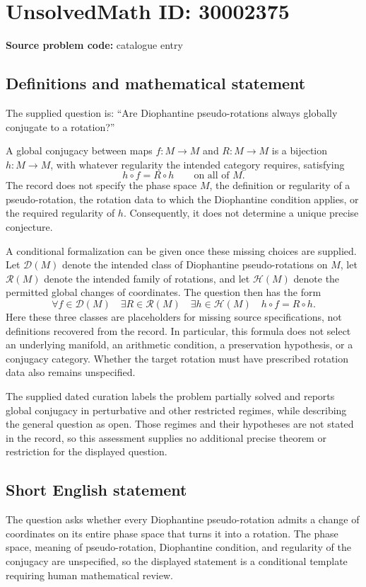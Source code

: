\documentclass[11pt]{article}
\begin{document}
\section*{UnsolvedMath ID: 30002375}
\textbf{Source problem code:} catalogue entry
\subsection{Definitions and mathematical statement}
The supplied question is: ``Are Diophantine pseudo-rotations always globally conjugate to a rotation?''

A global conjugacy between maps \(f\colon M\to M\) and \(R\colon M\to M\) is a bijection \(h\colon M\to M\), with whatever regularity the intended category requires, satisfying
\[
 h\circ f=R\circ h
 \qquad\text{on all of }M.
\]
The record does not specify the phase space \(M\), the definition or regularity of a pseudo-rotation, the rotation data to which the Diophantine condition applies, or the required regularity of \(h\). Consequently, it does not determine a unique precise conjecture.

A conditional formalization can be given once these missing choices are supplied. Let \(\mathcal D(M)\) denote the intended class of Diophantine pseudo-rotations on \(M\), let \(\mathcal R(M)\) denote the intended family of rotations, and let \(\mathcal H(M)\) denote the permitted global changes of coordinates. The question then has the form
\[
 \forall f\in\mathcal D(M)\quad
 \exists R\in\mathcal R(M)\quad
 \exists h\in\mathcal H(M)\quad
 h\circ f=R\circ h.
\]
Here these three classes are placeholders for missing source specifications, not definitions recovered from the record. In particular, this formula does not select an underlying manifold, an arithmetic condition, a preservation hypothesis, or a conjugacy category. Whether the target rotation must have prescribed rotation data also remains unspecified.

The supplied dated curation labels the problem partially solved and reports global conjugacy in perturbative and other restricted regimes, while describing the general question as open. Those regimes and their hypotheses are not stated in the record, so this assessment supplies no additional precise theorem or restriction for the displayed question.
\subsection{Short English statement}
The question asks whether every Diophantine pseudo-rotation admits a change of coordinates on its entire phase space that turns it into a rotation. The phase space, meaning of pseudo-rotation, Diophantine condition, and regularity of the conjugacy are unspecified, so the displayed statement is a conditional template requiring human mathematical review.
\end{document}
